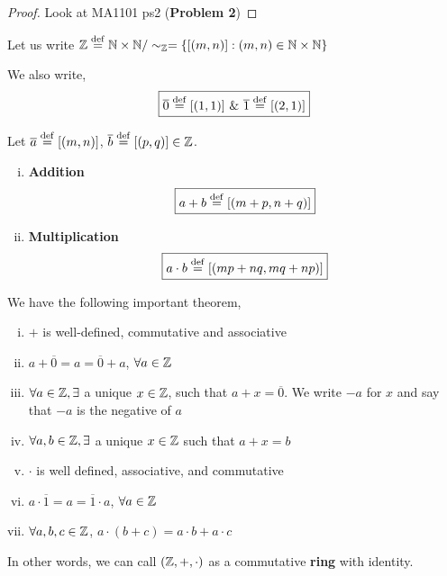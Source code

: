 \documentclass[11pt]{scrartcl}
\begin{document}
	\begin{proof}
		Look at MA1101 ps2 (\textbf{Problem 2})
	\end{proof}

	\begin{definition}
		Let us write $\mathbb Z \overset{\mathrm{def}}{=} \mathbb N \times \mathbb N / \sim_{\mathbb Z} = \{[(m,n)] : (m,n) \in \mathbb N \times \mathbb N\}$
		
		We also write,
		$$\boxed{\overline{0} \overset{\mathrm{def}}{=} [(1,1)]\ \&\ \overline{1} \overset{\mathrm{def}}{=} [(2,1)]}$$
		
		Let $\overline{a} \overset{\mathrm{def}}{=} [(m,n)]$, $\overline{b} \overset{\mathrm{def}}{=} [(p,q)] \in \mathbb Z$.
		\begin{enumerate}[i)]
			\item \textbf{Addition}\\
			$$\boxed{ a + b \overset{\mathrm{def}}{=} [(m+p, n+q)]}$$
			\item \textbf{Multiplication}\\
			$$\boxed{ a \cdot b \overset{\mathrm{def}}{=} [(mp+nq, mq+np)]}$$
		\end{enumerate}
	\label{definition:bar}
	\end{definition}

	We have the following important theorem,
	
	\begin{theorem}
		\begin{enumerate}[i)]
			\item $+$ is well-defined, commutative and associative
			\item $a+\overline{0} = a = \overline{0} + a$, $\forall a \in \mathbb Z$
			\item $\forall a \in \mathbb Z, \exists$ a unique $x \in \mathbb Z$, such that $a + x = \overline{0}$. We write $-a$ for $x$ and say that $-a$  is  the negative of $a$
			\item $\forall a,b \in \mathbb Z, \exists$ a unique $x \in \mathbb Z$ such that $a+x = b$
			\item $\cdot$ is well defined, associative, and commutative
			\item $a\cdot\overline{1} = a = \overline{1}\cdot a$, $\forall a \in \mathbb Z$
			\item $\forall a,b,c \in \mathbb Z$, $a\cdot (b+c) = a\cdot b + a\cdot c$
		\end{enumerate}
	\label{theorem:ring}
	\end{theorem}

	\begin{remark}
		In other words, we can call $(\mathbb Z, +, \cdot)$ as a commutative \textbf{ring} with identity.
	\end{remark}
\end{document}
